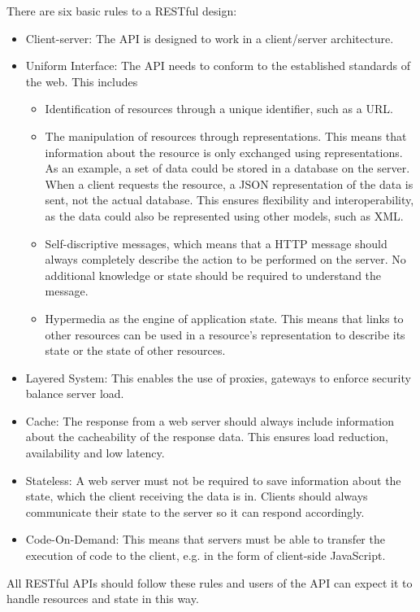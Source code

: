 There are six basic rules to a RESTful design:\cite[2]{masse2011rest}
\begin{itemize}
    \item Client-server: The API is designed to work in a client/server architecture.\cite[3]{masse2011rest}
    \item Uniform Interface: The API needs to conform to the established standards of the web.\cite[3]{masse2011rest}
    This includes
    \begin{itemize}
        \item Identification of resources through a unique identifier, such as a URL.\cite[3]{masse2011rest}
        \item The manipulation of resources through representations.
        This means that information about the resource is only exchanged using representations.
        As an example, a set of data could be stored in a database on the server. When a client
        requests the resource, a JSON representation of the data is sent, not the actual database.
        This ensures flexibility and interoperability, as the data could also be represented using
        other models, such as XML.\cite[3]{masse2011rest}
        \item Self-discriptive messages, which means that a HTTP message should always completely
        describe the action to be performed on the server. No additional knowledge or state should
        be required to understand the message.\cite[3]{masse2011rest}
        \item Hypermedia as the engine of application state. This means that links to other
        resources can be used in a resource's representation to describe its state or the state of
        other resources.\cite[3]{masse2011rest}
    \end{itemize}
    \item Layered System: This enables the use of proxies, gateways to
    enforce security balance server load.\cite[3]{masse2011rest}
    \item Cache: The response from a web server should always include information about the
    cacheability of the response data. This ensures load reduction, availability and low latency.\cite[3]{masse2011rest}
    \item Stateless: A web server must not be required to save information about the state,
    which the client receiving the data is in. Clients should always communicate their state to
    the server so it can respond accordingly.\cite[3]{masse2011rest}
    \item Code-On-Demand: This means that servers must be able to transfer the execution of code to the client,
    e.g. in the form of client-side JavaScript.\cite[3]{masse2011rest}
\end{itemize}

All RESTful APIs should follow these rules and users of the API can expect it to handle
resources and state in this way.